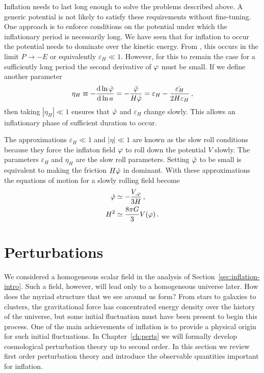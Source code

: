 Inflation needs to last long enough to solve the problems described above. A generic
potential is not likely to satisfy these requirements without fine-tuning. One
approach is to enforce conditions on the potential under which the inflationary
period is necessarily long. 
% 
We have seen that for
inflation to occur the potential needs to dominate over the kinetic energy. From
, this occurs in the limit $P\rightarrow -E$ or equivalently
$\varepsilon_H \ll 1$. However, for this to remain the case for a sufficiently long
period the second derivative of $\varphi$ must be small. If we define
another parameter 
% 
\begin{equation}
 \label{eq:etaHdefn-intro}
 \eta_H \equiv -\frac{\mathrm{d} \ln \dot{\varphi}}{\mathrm{d} \ln a} =
-\frac{\ddot{\varphi}}{H\dot{\varphi}}
 =\varepsilon_H -\frac{\dot{\varepsilon_H}}{2H\varepsilon_H}\,,
\end{equation}
% 
then taking $|\eta_H|\ll 1$ ensures that $\dot{\varphi}$ and $\varepsilon_H$
change slowly. This allows an inflationary phase of sufficient duration to occur.

The approximations $\varepsilon_H\ll 1$ and $|\eta|\ll 1$ are known as the
slow roll conditions because they force the inflaton field $\varphi$ to roll down
the potential $V$ slowly. The parameters $\varepsilon_H$ and $\eta_H$ are the
slow roll parameters. Setting $\ddot{\varphi}$ to be small is equivalent to
making the friction $H\dot{\varphi}$ in  dominant. With
these approximations the
equations of motion for a slowly rolling field become
% 
\begin{align}
 \dot{\varphi} &\simeq - \frac{V_{,\varphi}}{3H}\,, \\
 H^2 &\simeq \frac{8\pi G}{3}V(\varphi)\,.
\end{align}




\section{Perturbations}
\label{sec:perts-intro}

We considered a homogeneous scalar field in the analysis of
Section~\ref{sec:inflation-intro}. Such a field, however, will
lead only to a homogeneous universe later. How does the myriad structure
that we see around us form? From stars to galaxies to clusters, the
gravitational force has concentrated energy density over the history of the
universe, but some initial fluctuation must have been present to begin this
process. One of the main achievements of inflation is to provide a physical
origin for
such initial fluctuations. In Chapter~\ref{ch:perts} we will formally develop
cosmological perturbation theory up to second order. In this section we 
review first order perturbation theory and introduce the observable quantities
important for inflation.


